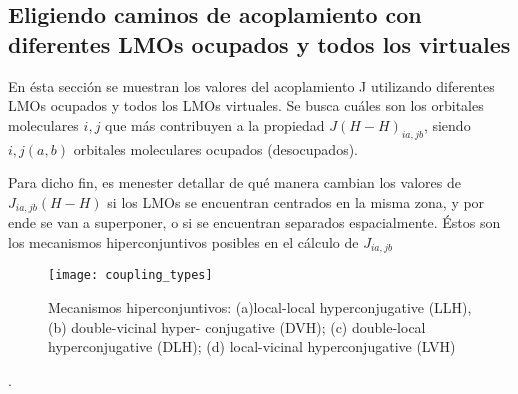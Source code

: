 \documentclass[
	12pt, %
]{fphw}
\begin{document}
\subsection*{Eligiendo caminos de acoplamiento con diferentes LMOs ocupados y todos los virtuales}

En ésta sección se muestran los valores del acoplamiento J utilizando diferentes LMOs ocupados y todos los LMOs virtuales.
Se busca cuáles son los orbitales moleculares $i,j$ que más contribuyen a la propiedad $J(H-H)_{ia,jb}$, siendo
$i,j (a,b)$ orbitales moleculares ocupados (desocupados). 

Para dicho fin, es menester detallar de qué manera cambian los valores de $J_{ia,jb} (H-H)$ si los LMOs se encuentran centrados
en la misma zona, y por ende se van a superponer, o si se encuentran separados espacialmente. Éstos son los 
mecanismos hiperconjuntivos posibles en el cálculo de $J_{ia,jb}$

\begin{figure}[h]
	\centering
	\texttt{[image: coupling\_types]}	
	\caption{Mecanismos hiperconjuntivos: (a)local-local hyperconjugative (LLH),(b) double-vicinal hyper-
	conjugative (DVH); (c) double-local hyperconjugative (DLH); (d)
	local-vicinal hyperconjugative (LVH)}
\end{figure}. 



\printbibliography
\end{document}
